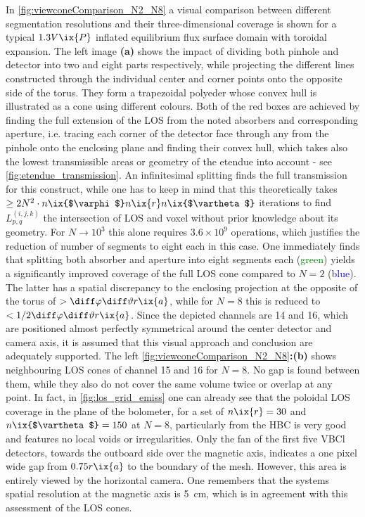             In \cref{fig:viewconeComparison_N2_N8} a visual comparison between different segmentation resolutions and their three-dimensional coverage is shown for a typical $1.3V\ix{P}$ inflated equilibrium flux surface domain with toroidal expansion. The left image \textbf{(a)} shows the impact of dividing both pinhole and detector into two and eight parts respectively, while projecting the different lines constructed through the individual center and corner points onto the opposite side of the torus. They form a trapezoidal polyeder whose convex hull is illustrated as a cone using different colours. Both of the red boxes are achieved by finding the full extension of the LOS from the noted absorbers and corresponding aperture, i.e. tracing each corner of the detector face through any from the pinhole onto the enclosing plane and finding their convex hull, which takes also the lowest transmissible areas or geometry of the etendue into account - see \cref{fig:etendue_transmission}. An infinitesimal splitting finds the full transmission for this construct, while one has to keep in mind that this theoretically takes $\ge 2N^{2}\cdot n\ix{$\varphi$}n\ix{r}n\ix{$\vartheta$}$ iterations to find $L^{\left(i,j,k\right)}_{p,q}$ the intersection of LOS and voxel without prior knowledge about its geometry. For $N\rightarrow10^{3}$ this alone requires $3.6\times10^{9}$ operations, which justifies the reduction of number of segments to eight each in this case. One immediately finds that splitting both absorber and aperture into eight segments each (\textcolor{green}{green}) yields a significantly improved coverage of the full LOS cone compared to $N=2$ (\textcolor{blue}{blue}). The latter has a spatial discrepancy to the enclosing projection at the opposite of the torus of $>\diff\varphi\diff\vartheta r\ix{a}$, while for $N=8$ this is reduced to $<1/2\diff\varphi\diff\vartheta r\ix{a}$. Since the depicted channels are 14 and 16, which are positioned almost perfectly symmetrical around the center detector and camera axis, it is assumed that this visual approach and conclusion are adequately supported. The left \cref{fig:viewconeComparison_N2_N8}\textbf{:(b)} shows neighbouring LOS cones of channel 15 and 16 for $N=8$. No gap is found between them, while they also do not cover the same volume twice or overlap at any point. In fact, in \cref{fig:los_grid_emiss} one can already see that the poloidal LOS coverage in the plane of the bolometer, for a set of $n\ix{r}=30$ and $n\ix{$\vartheta$}=150$ at $N=8$, particularly from the HBC is very good and features no local voids or irregularities. Only the fan of the first five VBCl detectors, towards the outboard side over the magnetic axis, indicates a one pixel wide gap from $0.75r\ix{a}$ to the boundary of the mesh. However, this area is entirely viewed by the horizontal camera. One remembers that the systems spatial resolution at the magnetic axis is \SI{5}{\centi\meter}, which is in agreement with this assessment of the LOS cones.\\%
